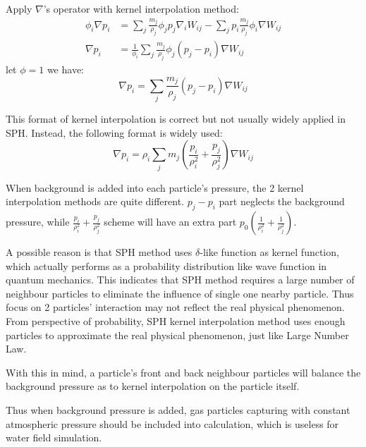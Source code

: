 Apply $\nabla$'s operator with kernel interpolation method:
\begin{equation}
    \begin{aligned}
        \phi_i\nabla p_i
    &= \sum_j 
    \frac{m_j}{\rho_j} \phi_j p_j \nabla_i W_{ij}
    -\sum_j
    p_i\frac{m_j}{\rho_j} \phi_i \nabla W_{ij}\\
    \nabla p_i
    &=
    \frac{1}{\phi_i}\sum_j
    \frac{m_j}{\rho_j} \phi_j (p_j-p_i) \nabla W_{ij}
    \end{aligned}
\end{equation}
let $\phi=1$ we have:
\begin{equation}
    \nabla p_i
    =
    \sum_j
    \frac{m_j}{\rho_j} (p_j-p_i) \nabla W_{ij}
\end{equation}

This format of kernel interpolation is correct but not usually widely applied in 
SPH. Instead, the following format is widely used:
\begin{equation}
    \nabla p_i
    =\rho_i
    \sum_j m_j
    \left(
        \frac{p_i}{\rho_i^2} + \frac{p_j}{\rho_j^2}
    \right)\nabla W_{ij}
\end{equation}

When background is added into each particle's pressure,
the 2 kernel interpolation methods are quite different.
$p_j-p_i$ part neglects the background pressure, 
while $\frac{p_i}{\rho_i^2} + \frac{p_j}{\rho_j^2}$ scheme
will have an extra part $p_0\left(
    \frac{1}{\rho_i^2} + \frac{1}{\rho_j^2}
\right)$.

A possible reason is that SPH method
uses $\delta$-like function as kernel function, which actually
performs as a probability distribution like wave function in quantum mechanics.
This indicates that SPH method requires a large number of neighbour particles to
eliminate the influence of single one nearby particle.
Thus focus on 2 particles' interaction may not reflect the real physical phenomenon.
From perspective of probability,
SPH kernel interpolation method uses enough particles to approximate the real physical phenomenon,
just like Large Number Law.

With this in mind, 
a particle's front and back neighbour particles will 
balance the background pressure as to kernel interpolation on the particle itself.

Thus when background pressure is added, 
gas particles capturing with constant atmospheric pressure should be 
included into calculation, which is useless for water field simulation.

